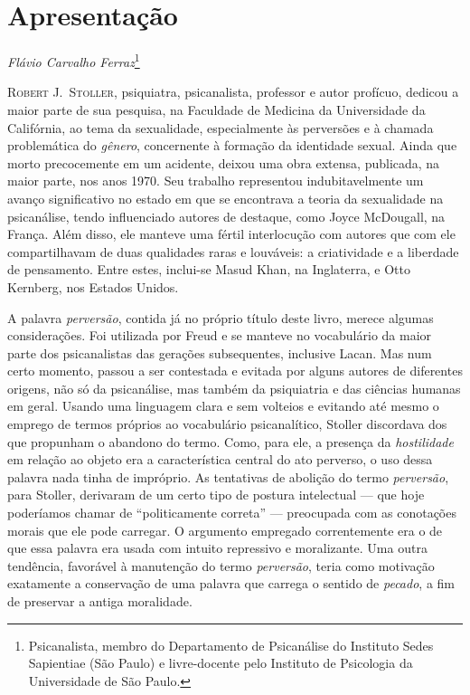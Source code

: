 \section{Apresentação}\label{apresentauxe7uxe3o}

\emph{Flávio Carvalho Ferraz}\footnote{Psicanalista, membro do
  Departamento de Psicanálise do Instituto Sedes Sapientiae (São Paulo)
  e livre-docente pelo Instituto de Psicologia da Universidade de São
  Paulo.}

\textsc{Robert J.~Stoller,} psiquiatra, psicanalista, professor e autor
profícuo, dedicou a maior parte de sua pesquisa, na Faculdade de
Medicina da Universidade da Califórnia, ao tema da sexualidade,
especialmente às perversões e à chamada problemática do \emph{gênero},
concernente à formação da identidade sexual. Ainda que morto
precocemente em um acidente, deixou uma obra extensa, publicada, na
maior parte, nos anos 1970. Seu trabalho representou indubitavelmente um
avanço significativo no estado em que se encontrava a teoria da
sexualidade na psicanálise, tendo influenciado autores de destaque, como
Joyce McDougall, na França. Além disso, ele manteve uma fértil
interlocução com autores que com ele compartilhavam de duas qualidades
raras e louváveis: a criatividade e a liberdade de pensamento. Entre
estes, inclui-se Masud Khan, na Inglaterra, e Otto Kernberg, nos Estados
Unidos.

A palavra \emph{perversão}, contida já no próprio título deste livro,
merece algumas considerações. Foi utilizada por Freud e se manteve no
vocabulário da maior parte dos psicanalistas das gerações subsequentes,
inclusive Lacan. Mas num certo momento, passou a ser contestada e
evitada por alguns autores de diferentes origens, não só da psicanálise,
mas também da psiquiatria e das ciências humanas em geral. Usando uma
linguagem clara e sem volteios e evitando até mesmo o emprego de termos
próprios ao vocabulário psicanalítico, Stoller discordava dos que
propunham o abandono do termo. Como, para ele, a presença da
\emph{hostilidade} em relação ao objeto era a característica central do
ato perverso, o uso dessa palavra nada tinha de impróprio. As tentativas
de abolição do termo \emph{perversão}, para Stoller, derivaram de um
certo tipo de postura intelectual --- que hoje poderíamos chamar de
``politicamente correta'' --- preocupada com as conotações morais que
ele pode carregar. O argumento empregado correntemente era o de que essa
palavra era usada com intuito repressivo e moralizante. Uma outra
tendência, favorável à manutenção do termo \emph{perversão}, teria como
motivação exatamente a conservação de uma palavra que carrega o sentido
de \emph{pecado}, a fim de preservar a antiga moralidade.

